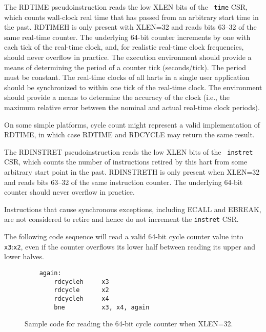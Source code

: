 The RDTIME pseudoinstruction reads the low XLEN bits of the {\tt
  time} CSR, which counts wall-clock real time that has passed from an
arbitrary start time in the past.
RDTIMEH is only present with XLEN=32 and reads bits 63--32 of the same
real-time counter.
The underlying 64-bit counter increments by one with each tick of the
real-time clock, and, for realistic real-time clock frequencies, should never
overflow in practice.
The execution environment should provide a means of determining the period of
a counter tick (seconds/tick).
The period must be constant.
The real-time clocks of all harts in a single user application
should be synchronized to within one tick of the real-time clock.
The environment should provide a means to determine the accuracy of the clock
(i.e., the maximum relative error between the nominal and actual real-time
clock periods).

\begin{commentary}
On some simple platforms, cycle count might represent a valid
implementation of RDTIME, in which case RDTIME and RDCYCLE may
return the same result.
\end{commentary}

The RDINSTRET pseudoinstruction reads the low XLEN bits of the {\tt
  instret} CSR, which counts the number of instructions retired by
this hart from some arbitrary start point in the past.  RDINSTRETH is
only present when XLEN=32 and reads bits 63--32 of the same
instruction counter. The underlying 64-bit counter should never
overflow in practice.

\begin{commentary}
Instructions that cause synchronous exceptions, including ECALL and EBREAK,
are not considered to retire and hence do not increment the {\tt instret} CSR.
\end{commentary}

The following code sequence will read a valid 64-bit cycle counter value into
{\tt x3}:{\tt x2}, even if the counter overflows its lower half between reading its upper
and lower halves.

\begin{figure}[h!]
\begin{center}
\begin{verbatim}
    again:
        rdcycleh     x3
        rdcycle      x2
        rdcycleh     x4
        bne          x3, x4, again
\end{verbatim}
\end{center}
\caption{Sample code for reading the 64-bit cycle counter when XLEN=32.}
\label{rdcycle}
\end{figure}

